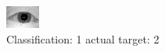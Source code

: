 \begin{figure}[h!]
\begin{center}
\includegraphics[width=0.60\columnwidth]{figures/ID972_class_1_target_2.png}
\end{center}
\caption{ Classification: 1 actual target: 2}
\label{fig:ID972_class_1_target_2}
\end{figure}

